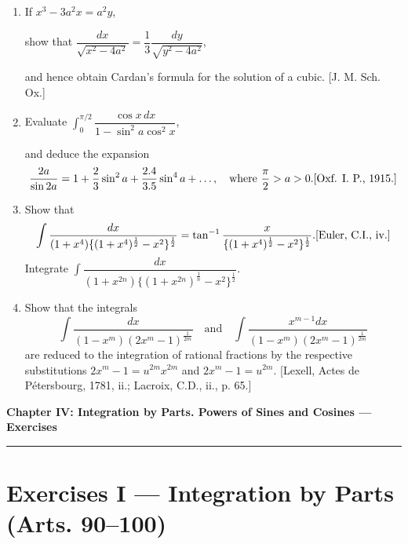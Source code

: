 \documentclass[11pt, a4paper]{article}
\newcommand{\source}[1]{\hfill\textnormal{[#1]}}
\begin{document}
\begin{enumerate}[leftmargin=2em]
Apply each of these methods to the integration of
\[
\int \dfrac{x\,dx}{\sqrt{x^2-6x+8}},
\]
showing that the result in each case reduces to
\[
\sqrt{x^2-6x+8}+3\cosh^{-1}(x-3),
\]
as derived by the method of Art. 85.

\item If $x^3-3a^2x=a^2y$,

show that $\dfrac{dx}{\sqrt{x^2-4a^2}}=\dfrac13\dfrac{dy}{\sqrt{y^2-4a^2}}$,

and hence obtain Cardan's formula for the solution of a cubic. \source{J. M. Sch. Ox.}

\item Evaluate $\displaystyle\int_0^{\pi/2} \dfrac{\cos x\,dx}{1-\sin^2a\cos^2x}$,

and deduce the expansion
\[
\dfrac{2a}{\sin 2a}=1+\dfrac23\sin^2a+\dfrac{2.4}{3.5}\sin^4a+\dots, \quad\text{where } \dfrac{\pi}{2}>a>0. \source{Oxf. I. P., 1915.}
\]

\item Show that
\[
\int \dfrac{dx}{(1+x^4)\{(1+x^4)^{\frac12}-x^2\}^{\frac12}}=\tan^{-1}\dfrac{x}{\{(1+x^4)^{\frac12}-x^2\}^{\frac12}}. \source{Euler, C.I., iv.}
\]
Integrate $\displaystyle\int \dfrac{dx}{(1+x^{2n})\{(1+x^{2n})^{\frac1n}-x^2\}^{\frac12}}$.

\item Show that the integrals
\[
\int \dfrac{dx}{(1-x^m)(2x^m-1)^{\frac{1}{2m}}} \quad\text{and}\quad \int \dfrac{x^{m-1}dx}{(1-x^m)(2x^m-1)^{\frac{1}{2m}}}
\]
are reduced to the integration of rational fractions by the respective substitutions $2x^m-1=u^{2m}x^{2m}$ and $2x^m-1=u^{2m}$. \source{Lexell, Actes de P\'etersbourg, 1781, ii.; Lacroix, C.D., ii., p. 65.}

\end{enumerate}

\newpage

\begin{center}
    {\LARGE \bfseries \color{accent} Chapter IV: Integration by Parts. Powers of Sines and Cosines --- Exercises}\\
    \vspace{0.2cm}
    {\color{accent}\rule{0.55\linewidth}{0.8pt}}
\end{center}
\vspace{0.35cm}

\section*{Exercises I --- Integration by Parts (Arts. 90--100)}
\end{document}
